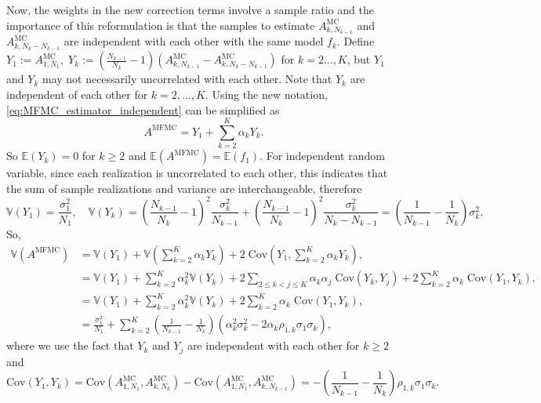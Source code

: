 \documentclass[final,3p,times,11pt]{elsarticle}
\begin{document}
Now, the weights in the new correction terms involve a sample ratio and the importance of this reformulation is that the samples to estimate $A_{k,N_{k-1}}^{\text{MC}}$ and $A_{k,N_k-N_{k-1}}^{\text{MC}}$ are independent with each other with the same model $f_k$. Define $Y_1 :=A^{\text{MC}}_{1,N_1},\; Y_k:=(\frac{N_{k-1}}{N_{k}}-1)(A_{k,N_{k-1}}^{\text{MC}}- A_{k,N_k-N_{k-1}}^{\text{MC}})$ for $k=2\ldots, K$, but $Y_1$ and $Y_k$ may not necessarily uncorrelated with each other.  Note that $Y_k$ are independent of each other for $k=2,\ldots, K$. Using the new notation, \eqref{eq:MFMC_estimator_independent} can be simplified as 
\[
A^{\text{MFMC}} = Y_1 + \sum_{k=2}^K \alpha_k Y_k.
\]
So $\mathbb{E}(Y_k) = 0$ for $k\ge 2$ and $\mathbb{E}(A^{\text{MFMC}}) = \mathbb{E}(f_1) $. For independent random variable, since each realization is uncorrelated to each other, this indicates that the sum of sample realizations and variance are interchangeable, therefore
\[
\mathbb{V}\left(Y_1\right) = \frac{\sigma_1^2}{N_1}, \quad \mathbb{V}\left(Y_k\right) = \left(\frac{N_{k-1}}{N_{k}}-1\right)^2\frac{\sigma_k^2}{N_{k-1}}+\left(\frac{N_{k-1}}{N_{k}}-1\right)^2\frac{\sigma_k^2}{N_k-N_{k-1}} = \left(\frac{1}{N_{k-1}} - \frac{1}{N_k}\right)\sigma_k^2.
\]
So,
\begin{align}
    \nonumber
    \mathbb{V}\left(A^{\text{MFMC}}\right) &= \mathbb{V}\left(Y_1\right) + \mathbb{V}\left(\sum_{k=2}^K \alpha_kY_k\right)+2\;\text{Cov}\left(Y_1,\sum_{k=2}^K \alpha_k Y_k \right),\\
    \nonumber
    &=\mathbb{V}\left(Y_1\right) + \sum_{k=2}^K \alpha_k^2 \mathbb{V}\left(Y_k\right)+2\sum_{2\le k<j\le K} \alpha_k\alpha_j\; \text{Cov}(Y_k,Y_j) +2\sum_{k=2}^K \alpha_k\;\text{Cov}\left(Y_1, Y_k\right),\\
    \nonumber
    &=\mathbb{V}\left(Y_1\right) + \sum_{k=2}^K \alpha_k^2 \mathbb{V}\left(Y_k\right) +2\sum_{k=2}^K \alpha_k\;\text{Cov}\left(Y_1, Y_k\right),\\
    \label{eq:MFMC_variance}
    &=\frac{\sigma_1^2}{N_1} + \sum_{k=2}^K \left(\frac{1}{N_{k-1}} - \frac{1}{N_k}\right)\left(\alpha_k^2\sigma_k^2 - 2\alpha_k\rho_{1,k}\sigma_1\sigma_k\right),
\end{align}
where we use the fact that $Y_k$ and $Y_j$ are independent with each other for $k\ge 2$ and \cite[Lemma~3.2]{PeWiGu:2016}
\[
\text{Cov}(Y_1,Y_k) = \text{Cov}\left(A^{\text{MC}}_{1,N_1},A^{\text{MC}}_{k,N_k}\right) - \text{Cov}\left(A^{\text{MC}}_{1,N_1},A^{\text{MC}}_{k,N_{k-1}}\right) = - \left(\frac{1}{N_{k-1}} - \frac{1}{N_k}\right)\rho_{1,k}\sigma_1\sigma_k.
\]
\end{document}
